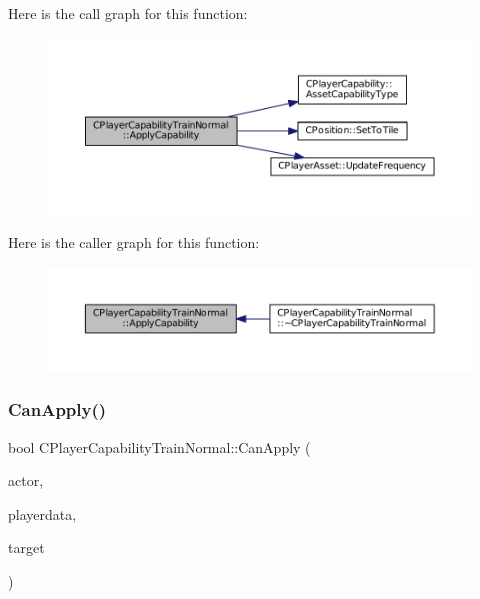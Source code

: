Here is the call graph for this function\+:\nopagebreak
\begin{figure}[H]
\begin{center}
\leavevmode
\includegraphics[width=350pt]{classCPlayerCapabilityTrainNormal_a04ed166d2072d44ddc96735ac1beb9bc_cgraph}
\end{center}
\end{figure}
Here is the caller graph for this function\+:\nopagebreak
\begin{figure}[H]
\begin{center}
\leavevmode
\includegraphics[width=350pt]{classCPlayerCapabilityTrainNormal_a04ed166d2072d44ddc96735ac1beb9bc_icgraph}
\end{center}
\end{figure}
\hypertarget{classCPlayerCapabilityTrainNormal_a625d2154bed47357f45662fe5dee7c1b}{}\label{classCPlayerCapabilityTrainNormal_a625d2154bed47357f45662fe5dee7c1b} 
\subsubsection{\texorpdfstring{Can\+Apply()}{CanApply()}}
{\footnotesize\ttfamily bool C\+Player\+Capability\+Train\+Normal\+::\+Can\+Apply (\begin{DoxyParamCaption}\item[{std\+::shared\+\_\+ptr$<$ \hyperlink{classCPlayerAsset}{C\+Player\+Asset} $>$}]{actor,  }\item[{std\+::shared\+\_\+ptr$<$ \hyperlink{classCPlayerData}{C\+Player\+Data} $>$}]{playerdata,  }\item[{std\+::shared\+\_\+ptr$<$ \hyperlink{classCPlayerAsset}{C\+Player\+Asset} $>$}]{target }\end{DoxyParamCaption})\hspace{0.3cm}{\ttfamily [virtual]}}



